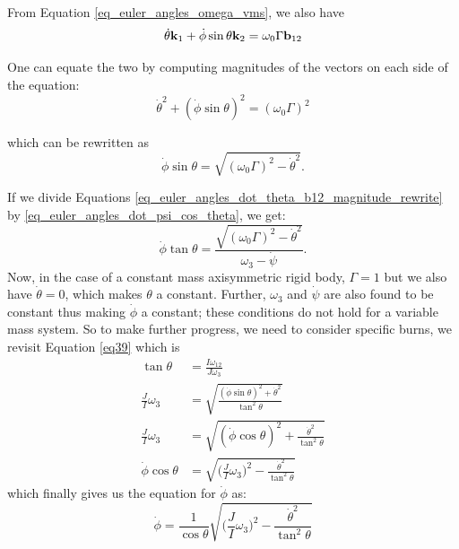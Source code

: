 From Equation \eqref{eq_euler_angles_omega_vms}, we also have
\begin{equation}
\label{eq_euler_angles_dot_theta_b12}
\dot{\theta} {\bf k}_1 + \dot{\phi} \sin \theta {\bf k}_{2} = \omega_0 \Gamma{\bf b}_{12} 
\end{equation}

One can equate the two by computing magnitudes of the vectors on each side of the equation:
\begin{equation}
\label{eq_euler_angles_dot_theta_b12_magnitude}
\dot{\theta}^2 + (\dot{\phi} \sin \theta)^2 = (\omega_0 \Gamma)^{2}
\end{equation}

which can be rewritten as
\begin{equation}
\label{eq_euler_angles_dot_theta_b12_magnitude_rewrite}
\dot{\phi} \sin \theta = \sqrt{(\omega_0 \Gamma)^{2} - \dot{\theta}^2}.
\end{equation}

If we divide Equations \eqref{eq_euler_angles_dot_theta_b12_magnitude_rewrite} by
\eqref{eq_euler_angles_dot_psi_cos_theta}, we get:
\begin{equation}
\label{eq_euler_angles_dot_phi_psi}
\dot{\phi} \tan \theta = \frac{\sqrt{(\omega_0 \Gamma)^{2} - \dot{\theta}^2}}{\omega_3 - \dot{\psi}}.
\end{equation}
Now, in the case of a constant mass axisymmetric rigid body, $\Gamma = 1$ but we also have $\dot
{\theta} = 0$, which makes $\theta$ a constant. Further, $\omega_3$ and $\dot{\psi}$ are also
found to be constant thus making $\dot{\phi}$ a constant; these conditions do not hold for a variable mass system. So to make further progress, we need to consider specific burns, we
revisit Equation \eqref{eq39} which is
\begin{align}
\label{eq39_tan_theta}
\tan \theta &= \frac{I \omega_{12}}{J \omega_3}\\
\frac{J}{I} \omega_3 &=  \sqrt{\frac{(\dot{\phi} \sin \theta)^2 + \dot{\theta}^2}{\tan^2 \theta}}\\
\frac{J}{I} \omega_3 &=  \sqrt{(\dot{\phi} \cos\theta)^2 + \frac{\dot{\theta}^2}{\tan^2 \theta}}\\
\dot{\phi} \cos\theta &= \sqrt{\bigg(\frac{J}{I} \omega_3\bigg)^2 - \frac{\dot{\theta}^2}{\tan^2 \theta}}
\end{align}
which finally gives us the equation for $\dot{\phi}$ as:
\begin{equation}
\label{eq_euler_angles_dot_phi_for_axisym_VMS}
\dot{\phi} = \frac{1}{\cos\theta} \sqrt{\bigg(\frac{J}{I} \omega_3\bigg)^2 - \frac{\dot{\theta}^2}{\tan^2 \theta}}
\end{equation}

